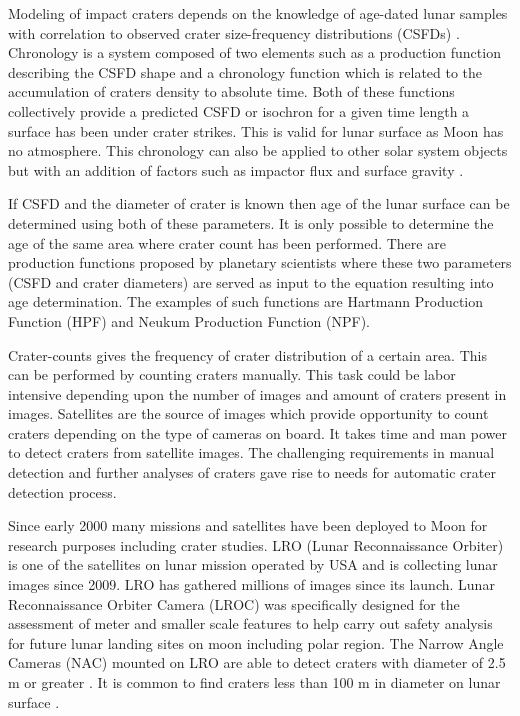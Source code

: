 \documentclass[11pt]{article}
\begin{document}
Modeling of impact craters depends on the knowledge of age-dated lunar samples with correlation to observed crater size-frequency distributions (CSFDs) \cite{williams2018dating}. Chronology is a system composed of two elements such as a production function describing the CSFD shape and a chronology function which is related to the accumulation of craters density to absolute time. Both of these functions collectively provide a predicted CSFD or isochron for a given time length a surface has been under crater strikes. This is valid for lunar surface as Moon has no atmosphere. This chronology can also be applied to other solar system objects but with an addition of factors such as impactor flux and surface gravity \cite{ivanov2002comparison}.

If CSFD and the diameter of crater is known then age of the lunar surface can be determined using both of these parameters. It is only possible to determine the age of the same area where crater count has been performed. There are production functions proposed by planetary scientists where these two parameters (CSFD and crater diameters) are served as input to the equation resulting into age determination. The examples of such functions are Hartmann Production Function (HPF) and Neukum Production Function (NPF).

Crater-counts gives the frequency of crater distribution of a certain area. This can be performed by counting craters manually. This task could be labor intensive depending upon the number of images and amount of craters present in images. Satellites are the source of images which provide opportunity to count craters depending on the type of cameras on board. It takes time and man power to detect craters from satellite images. The challenging requirements in manual detection and further analyses of craters gave rise to needs for automatic crater detection process.

Since early 2000 many missions and satellites have been deployed to Moon for research purposes including crater studies. LRO (Lunar Reconnaissance Orbiter) is one of the satellites on lunar mission operated by USA and is collecting lunar images since 2009. LRO has gathered millions of images since its launch. Lunar Reconnaissance Orbiter Camera (LROC) was specifically designed for the assessment of meter and smaller scale features to help carry out safety analysis for future lunar landing sites on moon including polar region. The Narrow Angle Cameras (NAC) mounted on LRO are able to detect craters with diameter of 2.5 m or greater \cite{robinson2010lunar}. It is common to find craters less than 100 m in diameter on lunar surface \cite{robinson2010lunar}.
\end{document}
